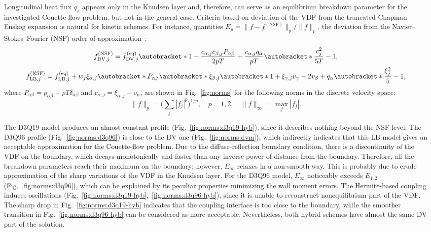 \documentclass{elsarticle} %
\DeclarePairedDelimiter\autobracket()       %
\newcommand{\br}[1]{\autobracket*{#1}}
\newcommand{\equil}[1]{#1^\mathrm{(eq)}}
\newcommand{\NSF}[1]{#1^\mathrm{(NSF)}}
\newcommand{\LB}{\mathrm{LB}}
\newcommand{\DV}{\mathrm{DV}}
\newcommand{\xiaj}{\xi_{\alpha,j}}
\newcommand{\xibj}{\xi_{\beta,j}}
\newcommand{\xigj}{\xi_{\gamma,j}}
\newcommand{\caj}{c_{\alpha,j}}
\newcommand{\cbj}{c_{\beta,j}}
\begin{document}
Longitudinal heat flux \(q_x\) appears only in the Knudsen layer and, therefore, can serve as an equilibrium breakdown parameter
for the investigated Couette-flow problem, but not in the general case.
Criteria based on deviation of the VDF from the truncated Chapman--Enskog expansion is natural for kinetic schemes.
For instance, quantities \(E_p=\|f-\NSF{f}\|_p/\|f\|_p\),
the deviation from the Navier--Stokes--Fourier (NSF) order of approximation~\cite{Zhang2014}:
\begin{gather}
    \NSF{f}_{\DV,j} = \equil{f}_{\DV,j}\br{
        1 + \frac{\caj\cbj P_{\alpha\beta}}{2pT} + \frac{\caj q_\alpha}{pT}\br{ \frac{c_j^2}{5T} - 1 } }, \label{eq:NSF_DV} \\
    \NSF{f}_{\LB,j} = \equil{f}_{\LB,j} + w_j\xiaj\br{
         P_{\alpha\beta}\br{\xibj\br{1 + \xigj v_\gamma} - 2 v_\beta } + q_\alpha\br{ \frac{\xi_j^2}5 - 1 } }, \label{eq:NSF_LB}
\end{gather}
where \(P_{\alpha\beta} = p_{\alpha\beta} - \rho T\delta_{\alpha\beta}\) and \(\caj = \xiaj - v_\alpha\),
are shown in Fig.~\ref{fig:norms} for the following norms in the discrete velocity space:
\begin{equation}\label{eq:norms}
    \|f\|_p = \bigg(\sum_j |f_j|^p \bigg)^{1/p}, \quad p=1,2, \quad \|f\|_\infty = \max_j |f_j|.
\end{equation}

The D3Q19 model produces an almost constant profile (Fig.~\ref{fig:norms:d3q19-hyb}),
since it describes nothing beyond the NSF level.
The D3Q96 profile (Fig.~\ref{fig:norms:d3q96}) is close to the DV one (Fig.~\ref{fig:norms:dvm}),
which indirectly indicates that this LB model gives an acceptable approximation for the Couette-flow problem.
Due to the diffuse-reflection boundary condition, there is a discontinuity of the VDF on the boundary,
which decays monotonically and faster than any inverse power of distance from the boundary.
Therefore, all the breakdown parameters reach their maximum on the boundary;
however, \(E_\infty\) relaxes in a non-smooth way.
This is probably due to crude approximation of the sharp variations of the VDF in the Knudsen layer.
For the D3Q96 model, \(E_\infty\) noticeably exceeds \(E_{1,2}\) (Fig.~\ref{fig:norms:d3q96}),
which can be explained by its peculiar properties minimizing the wall moment errors.
The Hermite-based coupling induces oscillations (Fig.~\ref{fig:norms:d3q19-hyb},~\ref{fig:norms:d3q96-hyb}),
since it is unable to reconstruct nonequilibrium part of the VDF.
The sharp drop in Fig.~\ref{fig:norms:d3q19-hyb} indicates that the coupling interface is too close to the boundary,
while the smoother transition in Fig.~\ref{fig:norms:d3q96-hyb} can be considered as more acceptable.
Nevertheless, both hybrid schemes have almost the same DV part of the solution.
\end{document}
